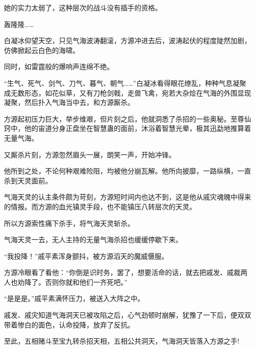 \begin{this_body}
她的实力太弱了，这种层次的战斗没有插手的资格。

轰隆隆……

白凝冰仰望天空，只见气海波涛翻滚，方源冲进去后，波涛起伏的程度陡然加剧，仿佛掀起云白色的海啸。

同时，如雷霆般的爆响声连绵不绝。

“生气、死气、剑气、刀气、暮气、朝气……”白凝冰看得眼花缭乱，种种气息凝聚成无数形态，如花似草，又有刀枪剑戟，走兽飞禽，宛若大杂烩在气海的外围显现凝聚，然后扑入气海当中去，和方源厮杀。

方源起初压力巨大，举步维艰，但片刻之后，他就洞悉了杀招的一些奥秘。至尊仙窍中，他的宙道分身正盘坐在智慧蛊的面前，沐浴着智慧光晕，极其迅勐地推算着无量气海。

又厮杀片刻，方源忽然眉头一展，朗笑一声，开始冲锋。

他所到之处，不论何种艰难险阻，均被他分崩瓦解。他所向披靡，一路纵横，一直杀到天灵面前。

气海天灵的认主条件颇为苛刻，方源短时间内也达不到，这是他从戚灾魂魄中得来的情报。而方源的血光镇灵手段，也不能镇压八转层次的天灵。

所以方源索性痛下杀手，将气海天灵斩杀。

气海天灵一去，无人主持的无量气海杀招也缓缓停歇下来。

“我投降！”戚平素浑身颤抖，被方源滔天的魔威慑服。

方源冷眼看了看他：“你倒是识时务，罢了，想要活命的话，就去把戚发、戚裁两人也劝降了。否则你就和他们一齐死吧。”

“是是是。”戚平素满怀压力，被送入大阵之中。

戚发、戚灾知道气海洞天已被攻陷之后，心气劲顿时崩解，犹豫了一下后，便双双带着惨白的面色，认命投降，放弃了反抗。

至此，五相赌斗至宝九转杀招天相，五相公共洞天，气海洞天皆落入方源之手!

\end{this_body}

